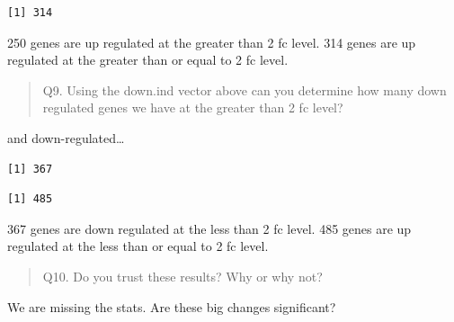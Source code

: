 \documentclass[
  letterpaper,
  DIV=11,
  numbers=noendperiod]{scrartcl}
\newenvironment{Shaded}{\begin{snugshade}}{\end{snugshade}}
\newcommand{\CommentTok}[1]{\textcolor[rgb]{0.37,0.37,0.37}{#1}}
\newcommand{\DecValTok}[1]{\textcolor[rgb]{0.68,0.00,0.00}{#1}}
\newcommand{\FunctionTok}[1]{\textcolor[rgb]{0.28,0.35,0.67}{#1}}
\newcommand{\NormalTok}[1]{\textcolor[rgb]{0.00,0.23,0.31}{#1}}
\newcommand{\SpecialCharTok}[1]{\textcolor[rgb]{0.37,0.37,0.37}{#1}}
\begin{document}
\begin{verbatim}
[1] 314
\end{verbatim}

250 genes are up regulated at the greater than 2 fc level. 314 genes are
up regulated at the greater than or equal to 2 fc level.

\begin{quote}
Q9. Using the down.ind vector above can you determine how many down
regulated genes we have at the greater than 2 fc level?
\end{quote}

\begin{Shaded}
\end{Shaded}

and down-regulated\ldots{}

\begin{Shaded}
\end{Shaded}

\begin{verbatim}
[1] 367
\end{verbatim}

\begin{Shaded}
\end{Shaded}

\begin{verbatim}
[1] 485
\end{verbatim}

367 genes are down regulated at the less than 2 fc level. 485 genes are
up regulated at the less than or equal to 2 fc level.

\begin{quote}
Q10. Do you trust these results? Why or why not?
\end{quote}

We are missing the stats. Are these big changes significant?
\end{document}
